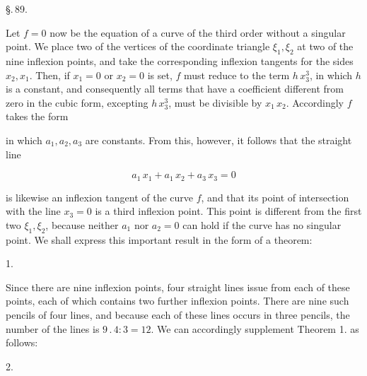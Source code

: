 \begin{center}
\S.\,89.

\end{center}

Let $f=0$ now be the equation of a curve of the third order
without a singular point. We place two of the vertices of the
coordinate triangle $\xi_1, \xi_2$ at two of the nine inflexion points,
and take the corresponding inflexion tangents for the
sides $x_2, x_1$. Then, if $x_1=0$ or $x_2=0$ is set, $f$ must
reduce to the term $h\,x_3^3$, in which $h$ is a constant,
and consequently all terms that have a coefficient different
from zero in the cubic form, excepting
$h\,x_3^3$, must be divisible by $x_1\,x_2$. Accordingly $f$ takes the form


in which $a_1, a_2, a_3$ are constants. From this, however, it follows that
the straight line

\[
a_1\,x_1 + a_1\,x_2 + a_3\,x_3 = 0
\] %

is likewise an inflexion tangent of the curve $f$, and that its point of
intersection with the line $x_3=0$ is a third inflexion point.
This point is different from the first two $\xi_1, \xi_2$, because
neither $a_1$ nor $a_2 = 0$ can hold if the curve has no singular
point. We shall express this important result in the form
of a theorem:

1. 

Since there are nine inflexion points, four straight lines
issue from each of these points, each of which contains two
further inflexion points. There are nine such pencils
of four lines, and because each of these lines occurs in three pencils,
the number of the lines is $9\,.\,4 : 3 = 12$. We
can accordingly supplement Theorem 1. as follows:

2. 

